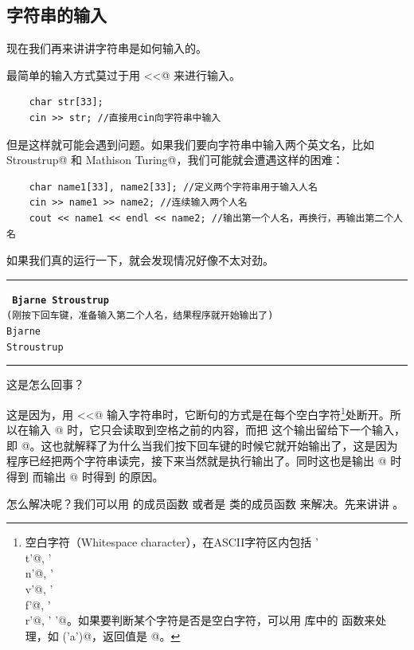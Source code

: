 \subsection*{字符串的输入}
现在我们再来讲讲字符串是如何输入的。\par
最简单的输入方式莫过于用 \lstinline@cin<<@ 来进行输入。
\begin{lstlisting}
    char str[33];
    cin >> str; //直接用cin向字符串中输入
\end{lstlisting}
但是这样就可能会遇到问题。如果我们要向字符串中输入两个英文名，比如 \lstinline@Bjarne Stroustrup@ 和 \lstinline@Alan Mathison Turing@，我们可能就会遭遇这样的困难：
\begin{lstlisting}
    char name1[33], name2[33]; //定义两个字符串用于输入人名
    cin >> name1 >> name2; //连续输入两个人名
    cout << name1 << endl << name2; //输出第一个人名，再换行，再输出第二个人名
\end{lstlisting}
如果我们真的运行一下，就会发现情况好像不太对劲。\\\noindent\rule{\linewidth}{.2pt}\texttt{
\textbf{Bjarne Stroustrup}\\{\kaishu(刚按下回车键，准备输入第二个人名，结果程序就开始输出了)}\\
Bjarne\\
Stroustrup
}\\\noindent\rule{\linewidth}{.2pt}
这是怎么回事？\par
这是因为，用 \lstinline@cin<<@ 输入字符串时，它断句的方式是在每个空白字符\footnote{空白字符（Whitespace character），在ASCII字符区内包括 \lstinline@'\\t'@, \lstinline@'\\n'@, \lstinline@'\\v'@, \lstinline@'\\f'@, \lstinline@'\\r'@, \lstinline@' '@。如果要判断某个字符是否是空白字符，可以用 \lstinline@cctype@ 库中的 \lstinline@isspace@ 函数来处理，如 \lstinline@isspace('a')@，返回值是 @。}处断开。所以在输入 @ 时，它只会读取到空格之前的内容，而把 \lstinline@Stroustrup@ 这个输出留给下一个输入，即 @。这也就解释了为什么当我们按下回车键的时候它就开始输出了，这是因为程序已经把两个字符串读完，接下来当然就是执行输出了。同时这也是输出 @ 时得到 \lstinline@Bjarne@ 而输出 @ 时得到 \lstinline@Stroustrup@ 的原因。\par
怎么解决呢？我们可以用 \lstinline@cin@ 的成员函数 \lstinline@get@ 或者是 \lstinline@istream@ 类的成员函数 \lstinline@getline@ 来解决。先来讲讲 \lstinline@getline@。\par
